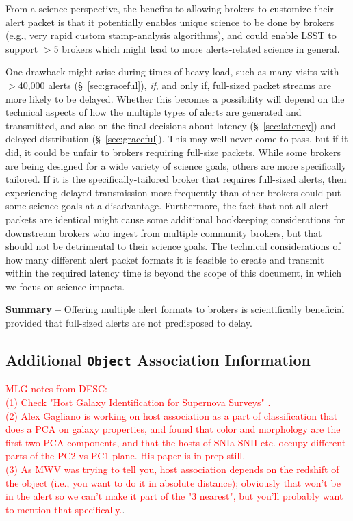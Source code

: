 \documentclass[DM,lsstdraft,authoryear,toc]{lsstdoc}
\begin{document}
From a science perspective, the benefits to allowing brokers to customize their alert packet is that it potentially enables unique science to be done by brokers (e.g., very rapid custom stamp-analysis algorithms), and could enable LSST to support $>$5 brokers which might lead to more alerts-related science in general.

One drawback might arise during times of heavy load, such as many visits with $>$40,000 alerts (\S~\ref{sec:graceful}), \emph{if}, and only if, full-sized packet streams are more likely to be delayed.
Whether this becomes a possibility will depend on the technical aspects of how the multiple types of alerts are generated and transmitted, and also on the final decisions about latency (\S~\ref{sec:latency}) and delayed distribution (\S~\ref{sec:graceful}).
This may well never come to pass, but if it did, it could be unfair to brokers requiring full-size packets.
While some brokers are being designed for a wide variety of science goals, others are more specifically tailored.
If it is the specifically-tailored broker that requires full-sized alerts, then experiencing delayed transmission more frequently than other brokers could put some science goals at a disadvantage. 
Furthermore, the fact that not all alert packets are identical might cause some additional bookkeeping considerations for downstream brokers who ingest from multiple community brokers, but that should not be detrimental to their science goals.
The technical considerations of how many different alert packet formats it is feasible to create and transmit within the required latency time is beyond the scope of this document, in which we focus on science impacts.

{\bf Summary --} Offering multiple alert formats to brokers is scientifically beneficial provided that full-sized alerts are not predisposed to delay.

\subsection{Additional {\tt Object} Association Information}\label{ssec:packets_add}

\textcolor{red}{MLG notes from DESC: \\ (1) Check "Host Galaxy Identification for Supernova Surveys" \citet{2016AJ....152..154G}. \\ (2) Alex Gagliano is working on host association as a part of classification that does a PCA on galaxy properties, and found that color and morphology are the first two PCA components, and that the hosts of SNIa SNII etc. occupy different parts of the PC2 vs PC1 plane. His paper is in prep still. \\ (3) As MWV was trying to tell you, host association depends on the redshift of the object (i.e., you want to do it in absolute distance); obviously that won't be in the alert so we can't make it part of the "3 nearest", but you'll probably want to mention that specifically.}.
\end{document}
